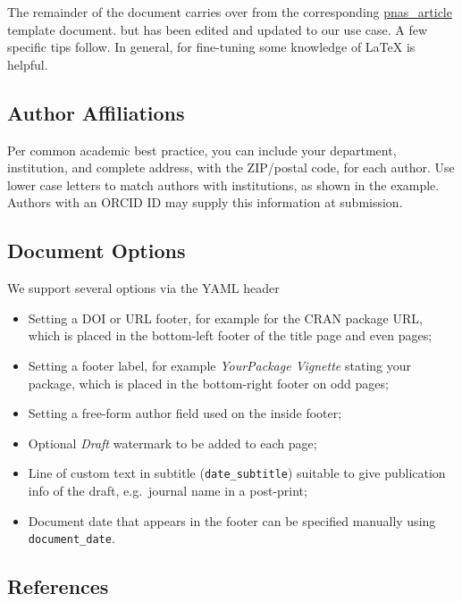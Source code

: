 \documentclass[letterpaper,9pt,twocolumn,twoside,]{pinp}
\providecommand{\tightlist}{%
  \setlength{\itemsep}{0pt}\setlength{\parskip}{0pt}}
\begin{document}
The remainder of the document carries over from the corresponding
\href{https://github.com/rstudio/rticles/tree/master/inst/rmarkdown/templates/pnas_article}{pnas\_article}
template document. but has been edited and updated to our use case. A
few specific tips follow. In general, for fine-tuning some knowledge of
LaTeX is helpful.

\hypertarget{author-affiliations}{%
\subsection{Author Affiliations}\label{author-affiliations}}

Per common academic best practice, you can include your department,
institution, and complete address, with the ZIP/postal code, for each
author. Use lower case letters to match authors with institutions, as
shown in the example. Authors with an ORCID ID may supply this
information at submission.

\hypertarget{document-options}{%
\subsection{Document Options}\label{document-options}}

We support several options via the YAML header

\begin{itemize}
\tightlist
\item
  Setting a DOI or URL footer, for example for the CRAN package URL,
  which is placed in the bottom-left footer of the title page and even
  pages;
\item
  Setting a footer label, for example \emph{YourPackage Vignette}
  stating your package, which is placed in the bottom-right footer on
  odd pages;
\item
  Setting a free-form author field used on the inside footer;
\item
  Optional \emph{Draft} watermark to be added to each page;
\item
  Line of custom text in subtitle (\texttt{date\_subtitle}) suitable to
  give publication info of the draft, e.g.~journal name in a post-print;
\item
  Document date that appears in the footer can be specified manually
  using \texttt{document\_date}.
\end{itemize}

\hypertarget{references}{%
\subsection{References}\label{references}}
\end{document}
